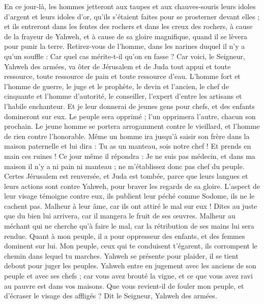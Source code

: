 \begin{multicols}{2}
En ce jour-là, les hommes jetteront aux taupes et aux chauves-souris leurs idoles d'argent et leurs idoles d'or, qu'ils s'étaient faites pour se prosterner devant elles ;
et ils entreront dans les fentes des rochers et dans les creux des rochers, à cause de la frayeur de Yahweh, et à cause de sa gloire magnifique, quand il se lèvera pour punir la terre.
Retirez-vous de l'homme, dans les narines duquel il n'y a qu'un souffle : Car quel cas mérite-t-il qu'on en fasse ?
\VerseOne{}Car voici, le Seigneur, Yahweh des armées, va ôter de Jérusalem et de Juda tout appui et toute ressource, toute ressource de pain et toute ressource d'eau.
L'homme fort et l'homme de guerre, le juge et le prophète, le devin et l'ancien,
le chef de cinquante et l'homme d'autorité, le conseiller, l'expert d'entre les artisans et l'habile enchanteur.
Et je leur donnerai de jeunes gens pour chefs, et des enfants domineront sur eux.
Le peuple sera opprimé ; l'un opprimera l'autre, chacun son prochain. Le jeune homme se portera arrogamment contre le vieillard, et l'homme de rien contre l'honorable.
Même un homme ira jusqu'à saisir son frère dans la maison paternelle et lui dira : Tu as un manteau, sois notre chef ! Et prends en main ces ruines !
Ce jour même il répondra : Je ne suis pas médecin, et dans ma maison il n'y a ni pain ni manteau ; ne m'établissez donc pas chef du peuple.
Certes Jérusalem est renversée, et Juda est tombée, parce que leurs langues et leurs actions sont contre Yahweh, pour braver les regards de sa gloire.
L'aspect de leur visage témoigne contre eux, ils publient leur péché comme Sodome, ils ne le cachent pas. Malheur à leur âme, car ils ont attiré le mal sur eux !
Dites au juste que du bien lui arrivera, car il mangera le fruit de ses œuvres.
Malheur au méchant qui ne cherche qu'à faire le mal, car la rétribution de ses mains lui sera rendue.
Quant à mon peuple, il a pour oppresseur des enfants, et des femmes dominent sur lui. Mon peuple, ceux qui te conduisent t'égarent, ils corrompent le chemin dans lequel tu marches.
Yahweh se présente pour plaider, il se tient debout pour juger les peuples.
Yahweh entre en jugement avec les anciens de son peuple et avec ses chefs ; car vous avez brouté la vigne, et ce que vous avez ravi au pauvre est dans vos maisons.
Que vous revient-il de fouler mon peuple, et d'écraser le visage des affligés ? Dit le Seigneur, Yahweh des armées.

\end{multicols}
